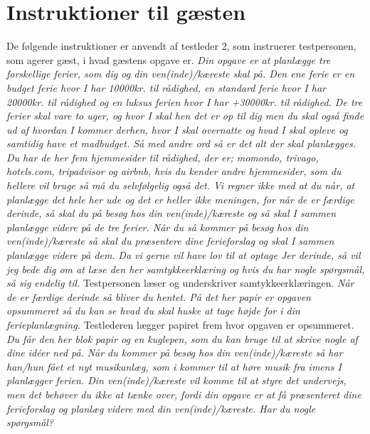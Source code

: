 \chapter{Instruktioner til gæsten}
\label{app:InstruktionerGaest}
%
De følgende instruktioner er anvendt af testleder 2, som instruerer testpersonen, som agerer gæst, i hvad gæstens opgave er.\blankline
%
\textit{Din opgave er at planlægge tre forskellige ferier, som dig og din ven(inde)/kæreste skal på. Den ene ferie er en budget ferie hvor I har 10000kr. til rådighed, en standard ferie hvor I har 20000kr. til rådighed og en luksus ferien hvor I har +30000kr. til rådighed. De tre ferier skal vare to uger, og hvor I skal hen det er op til dig men du skal også finde ud af hvordan I kommer derhen, hvor I skal overnatte og hvad I skal opleve og samtidig have et madbudget. Så med andre ord så er det alt der skal planlægges. Du har de her fem hjemmesider til rådighed, der er; momondo, trivago, hotels.com, tripadvisor og airbnb, hvis du kender andre hjemmesider, som du hellere vil bruge så må du selvfølgelig også det. Vi regner ikke med at du når, at planlægge det hele her ude og det er heller ikke meningen, for når de er færdige derinde, så skal du på besøg hos din ven(inde)/kæreste og så skal I sammen planlægge videre på de tre ferier. Når du så kommer på besøg hos din ven(inde)/kæreste så skal du præsentere dine ferieforslag og skal I sammen planlægge videre på dem.}\blankline
%
\textit{Da vi gerne vil have lov til at optage Jer derinde, så vil jeg bede dig om at læse den her samtykkeerklæring og hvis du har nogle spørgsmål, så sig endelig til.}\blankline
%
Testpersonen læser og underskriver samtykkeerklæringen.\blankline
%
\textit{Når de er færdige derinde så bliver du hentet. På det her papir er opgaven opsummeret så du kan se hvad du skal huske at tage højde for i din ferieplanlægning.}\blankline
%
Testlederen lægger papiret frem hvor opgaven er opsummeret. \blankline
%
\textit{Du får den her blok papir og en kuglepen, som du kan bruge til at skrive nogle af dine idéer ned på.}\blankline
%
\textit{Når du kommer på besøg hos din ven(inde)/kæreste så har han/hun fået et nyt musikanlæg, som i kommer til at høre musik fra imens I planlægger ferien. Din ven(inde)/kæreste vil komme til at styre det undervejs, men det behøver du ikke at tænke over, fordi din opgave er at få præsenteret dine ferieforslag og planlæg videre med din ven(inde)/kæreste. Har du nogle spørgsmål?}


